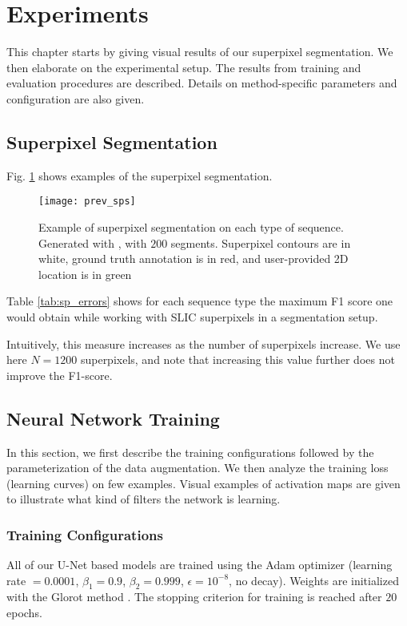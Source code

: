 \section{Experiments}
\label{sec:feats_results}
This chapter starts by giving visual results of our superpixel segmentation. We then elaborate on the experimental setup. The results from training and evaluation procedures are described. Details on method-specific parameters and configuration are also given.

\subsection{Superpixel Segmentation}
\label{sec:superpix}
Fig. \ref{fig:sp_example} shows examples of the superpixel segmentation.

\begin{figure}[htbp]
  \centering
  \texttt{[image: prev\_sps]}
  \caption[Superpixel segmentation example]{Example of superpixel segmentation on each type of sequence. Generated with \cite{achanta12}, with $200$ segments.
  Superpixel contours are in white, ground truth annotation is in red, and user-provided 2D location is in green}
  \label{fig:sp_example}
\end{figure}

Table \ref{tab:sp_errors} shows for each sequence type the maximum F1 score one would obtain while working with SLIC superpixels in a segmentation setup.

Intuitively, this measure increases as the number of superpixels increase.
We use here $N=1200$ superpixels, and note that increasing this value further does not improve the F1-score.



\subsection{Neural Network Training}
In this section, we first describe the training configurations followed by the parameterization of the data augmentation.
We then analyze the training loss (learning curves) on few examples.
Visual examples of activation maps are given to illustrate what kind of filters the network is learning.

\subsubsection{Training Configurations} \label{ch:training_conf}
All of our U-Net based models are trained using the Adam optimizer \cite{kingma15} (learning rate $= 0.0001$, $\beta_1 = 0.9$, $\beta_2 = 0.999$, $\epsilon = 10^{-8}$, no decay).
Weights are initialized with the Glorot method \cite{glorot10}.
The stopping criterion for training is reached after $20$ epochs.

